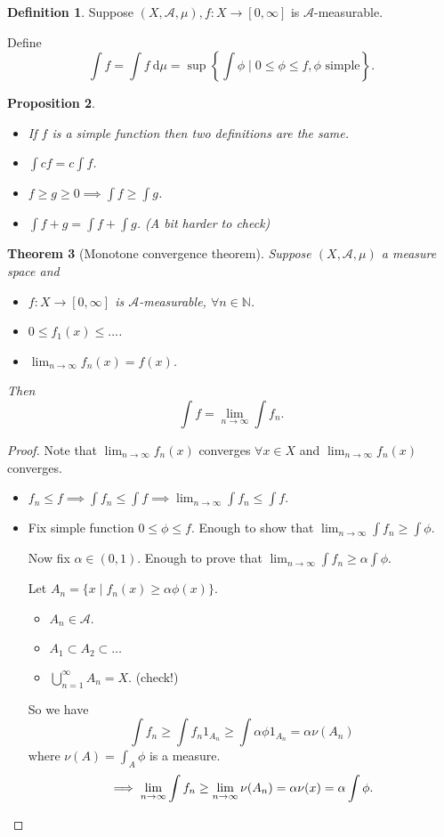\documentclass{report}
\newcommand{\N}{\mathbb{N}}
\newcommand{\cA}{\mathcal{A}}
\newcommand{\df}{\ \mathrm{d}}
\newtheorem{theorem}{Theorem}[chapter]
\newtheorem{proposition}[theorem]{Proposition}
\theoremstyle{definition}
\newtheorem{definition}[theorem]{Definition}
\theoremstyle{remark}
\newcommand{\fnl}{\parbox[t]{0\linewidth}{}}
\begin{document}
\begin{definition}
	Suppose $(X, \cA, \mu), f: X \to [0, \infty]$ is $\cA$-measurable. 

	Define \[
		\int f = \int f \df\mu = \sup\left\lbrace \int \phi \mid 0 \leq \phi \leq f, \phi \text{ simple} \right\rbrace.	
	\]
\end{definition}
\begin{proposition}\fnl
	\begin{itemize}
		\item If $f$ is a simple function then two definitions are the same.
		\item $\displaystyle \int cf = c\int f$.
		\item $\displaystyle f \geq g \geq 0 \implies \int f \geq \int g$.
		\item $\displaystyle \int f + g = \int f + \int g$. (A bit harder to check)
	\end{itemize}
\end{proposition}
\begin{theorem}[Monotone convergence theorem]
	Suppose $(X, \cA, \mu)$ a measure space and \begin{itemize}
		\item $f: X \to [0, \infty]$ is $\cA$-measurable, $\forall n \in \N$.
		\item $0 \leq f_1(x) \leq \ldots $.
		\item $\displaystyle \lim_{n \to \infty} f_n(x) = f(x)$.
	\end{itemize}
	Then
	\[
		\int f = \lim_{n \to \infty} \int f_n.	
	\]
\end{theorem}
\begin{proof}
	Note that $\lim_{n \to \infty} f_n(x)$ converges $\forall x \in X$ and $\lim_{n \to \infty} f_n(x)$ converges.
	\begin{itemize}
		\item $\displaystyle f_n \leq f \implies \int f_n \leq \int f \implies \lim_{n \to \infty} \int f_n \leq \int f$.
		\item Fix simple function $0 \leq \phi \leq f$. Enough to show that $\displaystyle \lim_{n \to \infty} \int f_n \geq \int \phi$.
		
		Now fix $\alpha \in (0, 1)$. Enough to prove that $\displaystyle \lim_{n \to \infty} \int f_n \geq \alpha \int \phi$.

		Let $A_n = \{x \mid f_n(x) \geq \alpha \phi(x)\}$. \begin{itemize}
			\item $A_n \in \cA$.
			\item $A_1 \subset A_2 \subset \ldots$
			\item $\displaystyle \bigcup_{n=1}^\infty A_n = X$. (check!)
		\end{itemize}
		So we have
		\[
			\int f_n \geq \int f_n1_{A_n} \geq \int \alpha \phi 1_{A_n}	= \alpha \nu(A_n)
		\] where $\nu(A) = \int_A \phi$ is a measure.
		\[\implies \lim_{n \to \infty} \int f_n \geq \lim_{n \to \infty} \nu(A_n) = \alpha \nu(x) = \alpha \int \phi. \qedhere\]
	\end{itemize}
\end{proof}
\end{document}
